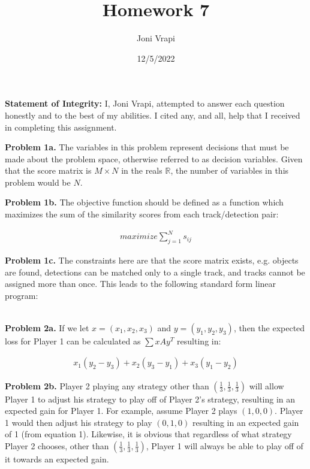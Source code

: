 \documentclass{article}
\title{Homework 7}
\author{Joni Vrapi}
\date{12/5/2022}
\begin{document}
\maketitle

\textbf{Statement of Integrity:} I, Joni Vrapi, attempted to answer each question honestly and to the best of my abilities. I cited any, and all, help that I received in completing this assignment.

\hfill

\textbf{Problem 1a.} The variables in this problem represent decisions that must be made about the problem space, otherwise referred to as decision variables. Given that the score matrix is $M \times N$ in the reals $\mathbb{R}$, the number of variables in this problem would be $N$.

\hfill

\textbf{Problem 1b.} The objective function should be defined as a function which maximizes the sum of the similarity scores from each track/detection pair:

\begin{gather}
    maximize \sum_{j=1}^N s_{ij}
\end{gather}

\hfill

\textbf{Problem 1c.} The constraints here are that the score matrix exists, e.g. objects are found, detections can be matched only to a single track, and tracks cannot be assigned more than once. This leads to the following standard form linear program:

\begin{gather}
    
\end{gather}

\hfill

\textbf{Problem 2a.} If we let $x = (x_1, x_2, x_3)$ and $y = (y_1, y_2, y_3)$, then the expected loss for Player 1 can be calculated as $\sum{xAy^T}$ resulting in:

\begin{gather}
    x_1(y_2-y_3) + x_2(y_3-y_1) + x_3(y_1-y_2)
\end{gather}

\hfill

\textbf{Problem 2b.} Player 2 playing any strategy other than $(\frac{1}{3}, \frac{1}{3}, \frac{1}{3})$ will allow Player 1 to adjust his strategy to play off of Player 2's strategy, resulting in an expected gain for Player 1. For example, assume Player 2 plays $(1, 0, 0)$. Player 1 would then adjust his strategy to play $(0, 1, 0)$ resulting in an expected gain of 1 (from equation 1). Likewise, it is obvious that regardless of what strategy Player 2 chooses, other than $(\frac{1}{3}, \frac{1}{3}, \frac{1}{3})$, Player 1 will always be able to play off of it towards an expected gain.
\end{document}
